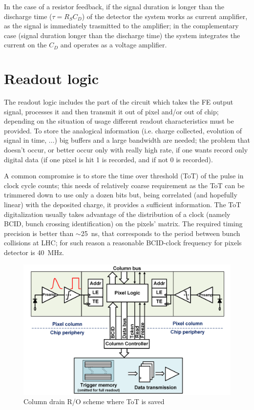      In the case of a resistor feedback, if the signal duration is longer than the discharge time ($\tau=R_S C_D$) of the detector the system works as current amplifier, as the signal is immediately trasmitted to the amplifier; in the complementary case (signal duration longer than the discharge time) the system integrates the current on the $C_D$ and operates as a voltage amplifier.
      
\section{Readout logic}
   The readout logic includes the part of the circuit which takes the FE output signal, processes it and then transmit it out of pixel and/or out of chip; depending on the situation of usage different readout characteristics must be provided. 
   To store the analogical information (i.e. charge collected, evolution of signal in time, ...) big buffers and a large bandwidth are needed; the problem that doesn't occur, or better occur only with really high rate, if one wants record only digital data (if one pixel is hit 1 is recorded, and if not 0 is recorded). 

   A common compromise is to store the time over threshold (ToT) of the pulse in clock cycle counts; this needs of relatively coarse requirement as the ToT can be trimmered down to use only a dozen bits but, being correlated (and hopefully linear) with the deposited charge, it provides a sufficient information.
   The ToT digitalization usually takes advantage of the distribution of a clock (namely BCID,  bunch crossing identification) on the pixels' matrix. The required timing precision is better than $\sim$\SI{25}{ns}, that corresponds to the period between bunch collisions at LHC; for such reason a reasonable BCID-clock frequency for pixels detector is \SI{40}{MHz}.
   \begin{figure}[h!]
      \centering
      \includegraphics[width=.7\linewidth]{figures/Pixel_detectors/column_drain_RO.png}
      \caption{Column drain R/O scheme where ToT is saved}
      \label{fig:column_drain_RO-like}
   \end{figure}

